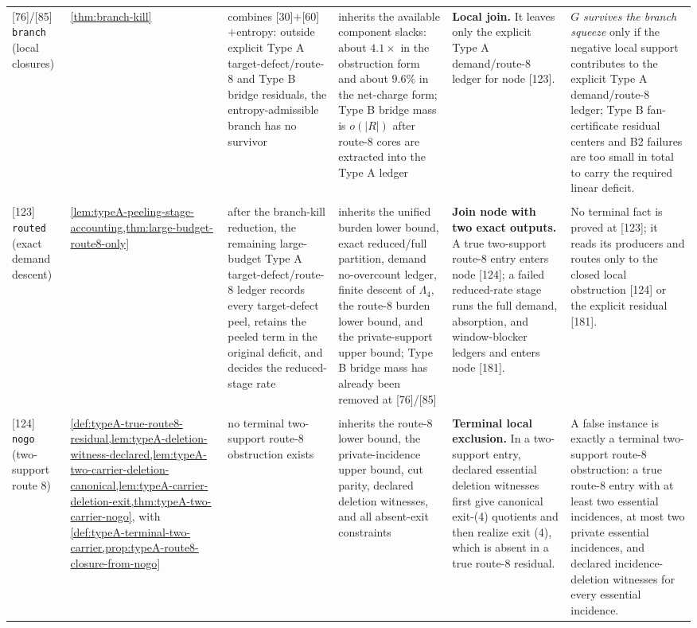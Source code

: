 \documentclass[11pt]{article}
\begin{document}
{\begin{longtable}{L{0.09\textwidth} L{0.095\textwidth} L{0.15\textwidth} L{0.08\textwidth} L{0.105\textwidth} L{0.335\textwidth}}
{[76]}/{[85]} \texttt{branch} (local closures) & \cref{thm:branch-kill} & combines {[30]}$+${[60]}$+$entropy: outside explicit Type A target-defect/route-8 and Type B bridge residuals, the entropy-admissible branch has no survivor & inherits the available component slacks: about $4.1\times$ in the obstruction form and about $9.6\%$ in the net-charge form; Type B bridge mass is $o(|R|)$ after route-8 cores are extracted into the Type A ledger & \textbf{Local join.} It leaves only the explicit Type A demand/route-8 ledger for node {[123]}. & $G$ \emph{survives the branch squeeze} only if the negative local support contributes to the explicit Type A demand/route-8 ledger; Type B fan-certificate residual centers and B2 failures are too small in total to carry the required linear deficit. \\\\
{[123]} \texttt{routed} (exact demand descent) & \cref{lem:typeA-peeling-stage-accounting,thm:large-budget-route8-only} & after the branch-kill reduction, the remaining large-budget Type A target-defect/route-8 ledger records every target-defect peel, retains the peeled term in the original deficit, and decides the reduced-stage rate & inherits the unified burden lower bound, exact reduced/full partition, demand no-overcount ledger, finite descent of \(\Lambda_4\), the route-8 burden lower bound, and the private-support upper bound; Type B bridge mass has already been removed at {[76]}/{[85]} & \textbf{Join node with two exact outputs.} A true two-support route-8 entry enters node {[124]}; a failed reduced-rate stage runs the full demand, absorption, and window-blocker ledgers and enters node {[181]}. & No terminal fact is proved at {[123]}; it reads its producers and routes only to the closed local obstruction {[124]} or the explicit residual {[181]}. \\\\
{[124]} \texttt{nogo} (two-support route 8) & \cref{def:typeA-true-route8-residual,lem:typeA-deletion-witness-declared,lem:typeA-two-carrier-deletion-canonical,lem:typeA-carrier-deletion-exit,thm:typeA-two-carrier-nogo}, with \cref{def:typeA-terminal-two-carrier,prop:typeA-route8-closure-from-nogo} & no terminal two-support route-8 obstruction exists & inherits the route-8 lower bound, the private-incidence upper bound, cut parity, declared deletion witnesses, and all absent-exit constraints & \textbf{Terminal local exclusion.} In a two-support entry, declared essential deletion witnesses first give canonical exit-(4) quotients and then realize exit (4), which is absent in a true route-8 residual. & A false instance is exactly a terminal two-support route-8 obstruction: a true route-8 entry with at least two essential incidences, at most two private essential incidences, and declared incidence-deletion witnesses for every essential incidence. \\

\end{longtable}}
\end{document}
